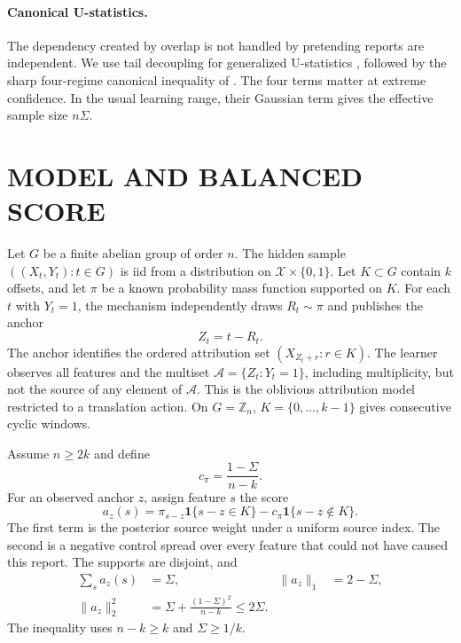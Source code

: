 \documentclass[twoside]{article}
\newcommand{\1}{\mathbf 1}
\newcommand{\cA}{\mathcal A}
\begin{document}
\paragraph{Canonical U-statistics.}
The dependency created by overlap is not handled by pretending reports are independent. We use tail decoupling for generalized U-statistics \citep{delapena1995decoupling}, followed by the sharp four-regime canonical inequality of \citet{gine2000exponential}. The four terms matter at extreme confidence. In the usual learning range, their Gaussian term gives the effective sample size $n\Sigma$.

\section{MODEL AND BALANCED SCORE}

Let $G$ be a finite abelian group of order $n$. The hidden sample $((X_t,Y_t):t\in G)$ is iid from a distribution on $\mathcal X\times\{0,1\}$. Let $K\subset G$ contain $k$ offsets, and let $\pi$ be a known probability mass function supported on $K$. For each $t$ with $Y_t=1$, the mechanism independently draws $R_t\sim\pi$ and publishes the anchor
\begin{equation}
 Z_t=t-R_t.
 \label{eq:anchor}
\end{equation}
The anchor identifies the ordered attribution set $(X_{Z_t+r}:r\in K)$. The learner observes all features and the multiset $\cA=\{Z_t:Y_t=1\}$, including multiplicity, but not the source of any element of $\cA$. This is the oblivious attribution model restricted to a translation action. On $G=\mathbb Z_n$, $K=\{0,\ldots,k-1\}$ gives consecutive cyclic windows.

Assume $n\ge2k$ and define
\begin{equation}
 c_\pi=\frac{1-\Sigma}{n-k}.
 \label{eq:cpi}
\end{equation}
For an observed anchor $z$, assign feature $s$ the score
\begin{equation}
 a_z(s)=\pi_{s-z}\1\{s-z\in K\}
       -c_\pi\1\{s-z\notin K\}.
 \label{eq:score}
\end{equation}
The first term is the posterior source weight under a uniform source index. The second is a negative control spread over every feature that could not have caused this report. The supports are disjoint, and
\begin{align}
 \sum_s a_z(s)&=\Sigma, & \|a_z\|_1&=2-\Sigma,\label{eq:mass}\\
 \|a_z\|_2^2&=\Sigma+\frac{(1-\Sigma)^2}{n-k}\le2\Sigma.\label{eq:energy}
\end{align}
The inequality uses $n-k\ge k$ and $\Sigma\ge1/k$.
\end{document}
